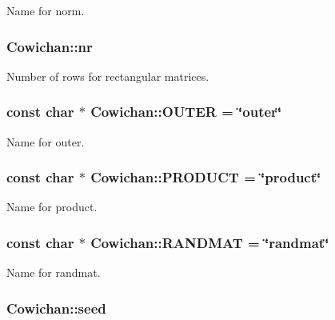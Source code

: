 Name for norm. \hypertarget{class_cowichan_44f139040042cc616e542be6faa28672}{
\subsubsection[{nr}]{ {\bf Cowichan::nr}}}
\label{class_cowichan_44f139040042cc616e542be6faa28672}


Number of rows for rectangular matrices. \hypertarget{class_cowichan_b858724b8531751af4f611b978998be4}{
\subsubsection[{OUTER}]{\setlength{\rightskip}{0pt plus 5cm}const char $\ast$ {\bf Cowichan::OUTER} = \char`\"{}outer\char`\"{}}}
\label{class_cowichan_b858724b8531751af4f611b978998be4}


Name for outer. \hypertarget{class_cowichan_57a1deea813a95ad7ed5a46dd000e576}{
\subsubsection[{PRODUCT}]{\setlength{\rightskip}{0pt plus 5cm}const char $\ast$ {\bf Cowichan::PRODUCT} = \char`\"{}product\char`\"{}}}
\label{class_cowichan_57a1deea813a95ad7ed5a46dd000e576}


Name for product. \hypertarget{class_cowichan_c9e66484bf3be07bfeac5511f514f102}{
\subsubsection[{RANDMAT}]{\setlength{\rightskip}{0pt plus 5cm}const char $\ast$ {\bf Cowichan::RANDMAT} = \char`\"{}randmat\char`\"{}}}
\label{class_cowichan_c9e66484bf3be07bfeac5511f514f102}


Name for randmat. \hypertarget{class_cowichan_e9f8e9769f15e2648435064d4286b1a6}{
\subsubsection[{seed}]{ {\bf Cowichan::seed}}}
\label{class_cowichan_e9f8e9769f15e2648435064d4286b1a6}


